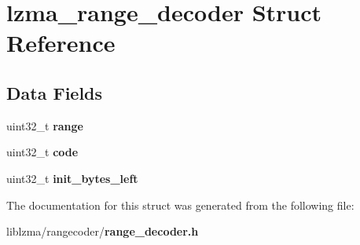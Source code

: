 \section{lzma\-\_\-range\-\_\-decoder Struct Reference}
\label{structlzma__range__decoder}
\subsection*{Data Fields}
\begin{DoxyCompactItemize}
\item 
uint32\-\_\-t {\bfseries range}\label{structlzma__range__decoder_ae6d66f625c8e177a0f50e65186201816}

\item 
uint32\-\_\-t {\bfseries code}\label{structlzma__range__decoder_af35718564faa62de08a0216c438f8360}

\item 
uint32\-\_\-t {\bfseries init\-\_\-bytes\-\_\-left}\label{structlzma__range__decoder_ac630830e86260478cf270756e6dd266a}

\end{DoxyCompactItemize}


The documentation for this struct was generated from the following file\-:\begin{DoxyCompactItemize}
\item 
liblzma/rangecoder/{\bf range\-\_\-decoder.\-h}\end{DoxyCompactItemize}
